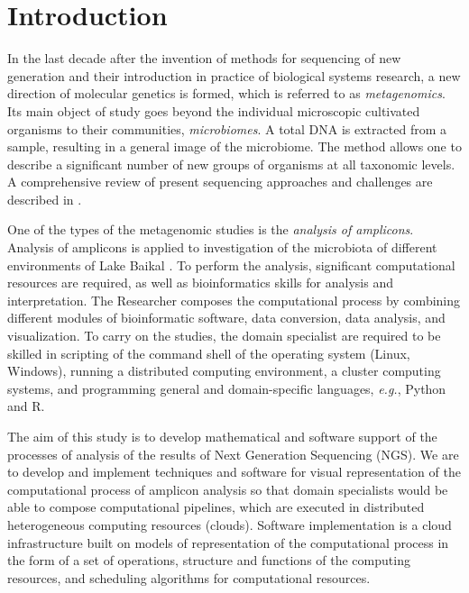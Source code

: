 \documentclass[a4paper]{jpconf}
\begin{document}

\section{Introduction}


In the last decade after the invention of methods for sequencing of new generation and their introduction in practice of biological systems research, a new direction of molecular genetics is formed, which is referred to as \emph{metagenomics}. Its main object of study goes beyond the individual microscopic cultivated organisms to their communities, \emph{microbiomes}. A total DNA is extracted from a sample, resulting in a general image of the microbiome. The method allows one to describe a significant number of new groups of organisms at all taxonomic levels. A comprehensive review of present sequencing approaches and challenges are described in \cite{pere20}.

One of the types of the metagenomic studies is the \emph{analysis of amplicons}. Analysis of amplicons is applied to investigation of the microbiota of different environments of Lake Baikal \cite{underice}. To perform the analysis, significant computational resources are required, as well as bioinformatics skills for analysis and interpretation. The Researcher composes the computational process by combining different modules of bioinformatic software, data conversion, data analysis, and visualization. To carry on the studies, the domain specialist are required to be skilled in scripting of the command shell of the operating system (Linux, Windows), running a distributed computing environment, a cluster computing systems, and programming general and domain-specific languages, \emph{e.g.}, Python and R.

The aim of this study is to develop mathematical and software support of the processes of analysis of the results of Next Generation Sequencing (NGS). We are to develop and implement techniques and software for visual representation of the computational process of amplicon analysis so that domain specialists would be able to compose computational pipelines, which are executed in distributed heterogeneous computing resources (clouds). Software implementation is a cloud infrastructure built on models of representation of the computational process in the form of a set of operations, structure and functions of the computing resources, and scheduling algorithms for computational resources.
\end{document}
